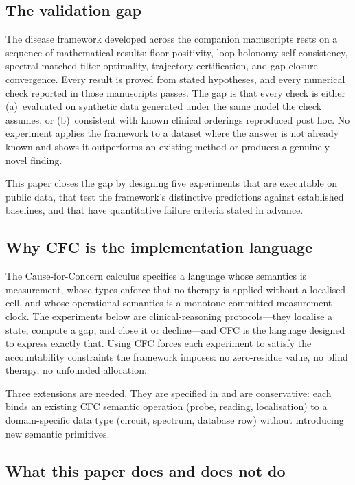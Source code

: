\documentclass[11pt,a4paper]{article}
\theoremstyle{expthm}
\theoremstyle{definition}
\theoremstyle{remark}
\begin{document}
\subsection{The validation gap}

The disease framework developed across the companion manuscripts rests on
a sequence of mathematical results: floor positivity, loop-holonomy
self-consistency, spectral matched-filter optimality, trajectory
certification, and gap-closure convergence. Every result is proved from
stated hypotheses, and every numerical check reported in those manuscripts
passes. The gap is that every check is either (a)~evaluated on synthetic
data generated under the same model the check assumes, or
(b)~consistent with known clinical orderings reproduced post hoc. No
experiment applies the framework to a dataset where the answer is not
already known and shows it outperforms an existing method or produces a
genuinely novel finding.

This paper closes the gap by designing five experiments that are
executable on public data, that test the framework's distinctive
predictions against established baselines, and that have quantitative
failure criteria stated in advance.

\subsection{Why CFC is the implementation language}

The Cause-for-Concern calculus \citep{sachikonye2026cfc} specifies a
language whose semantics is measurement, whose types enforce that no
therapy is applied without a localised cell, and whose operational
semantics is a monotone committed-measurement clock. The experiments
below are clinical-reasoning protocols---they localise a state, compute
a gap, and close it or decline---and CFC is the language designed to
express exactly that. Using CFC forces each experiment to satisfy the
accountability constraints the framework imposes: no zero-residue value,
no blind therapy, no unfounded allocation.

Three extensions are needed. They are specified in 
and are conservative: each binds an existing CFC semantic operation
(probe, reading, localisation) to a domain-specific data type (circuit,
spectrum, database row) without introducing new semantic primitives.

\subsection{What this paper does and does not do}
\end{document}
